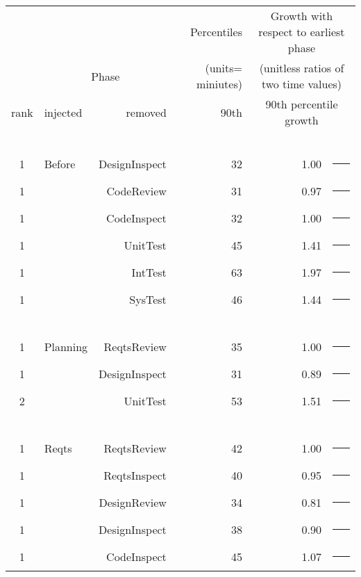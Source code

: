 \scriptsize
\begin{tabular}{c|lr|r|rl}
  & \multicolumn{2}{c|}{ } &  Percentiles & \multicolumn{2}{c}{Growth with respect to earliest phase  } \\ 
   & \multicolumn{2}{c|}{Phase} &  (units= miniutes) & \multicolumn{2}{c}{(unitless ratios of two time values) } \\\hline


  rank & injected & removed &   90th   &  \multicolumn{2}{c}{90th percentile growth} \\ 
\hline\multicolumn{6}{c}{~}  \\
1 &  Before   &   DesignInspect     & 32  &  1.00 & \textcolor{black}{\rule{10mm}{2mm}}\\
1 &   &   CodeReview      &   31   &    0.97 & \textcolor{black}{\rule{9mm}{2mm}}\\
1 &   &   CodeInspect     &   32   &    1.00 & \textcolor{black}{\rule{10mm}{2mm}}\\
1 &   &   UnitTest        &   45  &    1.41 & \textcolor{black}{\rule{14mm}{2mm}}\\
1 &   &   IntTest         &   63  &   1.97 & \textcolor{black}{\rule{19mm}{2mm}}\\
1 &   &   SysTest         &   46   &   1.44 & \textcolor{black}{\rule{14mm}{2mm}}\\  
\hline\multicolumn{6}{c}{~}  \\
1 &  Planning     &   ReqtsReview       & 35   &   1.00 & \textcolor{black}{\rule{10mm}{2mm}}\\
1 &               &   DesignInspect     & 31  &   0.89 & \textcolor{black}{\rule{8mm}{2mm}}\\
2 &               &   UnitTest          & 53 &   1.51 & \textcolor{black}{\rule{15mm}{2mm}}\\
\hline\multicolumn{6}{c}{~}  \\
1 &  Reqts   &   ReqtsReview      & 42 &    1.00 & \textcolor{black}{\rule{10mm}{2mm}}\\
1 &          &   ReqtsInspect      & 40 &     0.95 & \textcolor{black}{\rule{9mm}{2mm}}\\
1 &          &   DesignReview      & 34 &    0.81 & \textcolor{black}{\rule{8mm}{2mm}}\\
1 &          &   DesignInspect     & 38 &     0.90 & \textcolor{black}{\rule{9mm}{2mm}}\\
1 &          &   CodeInspect      & 45 &   1.07 & \textcolor{black}{\rule{10mm}{2mm}}\\

\end{tabular}
